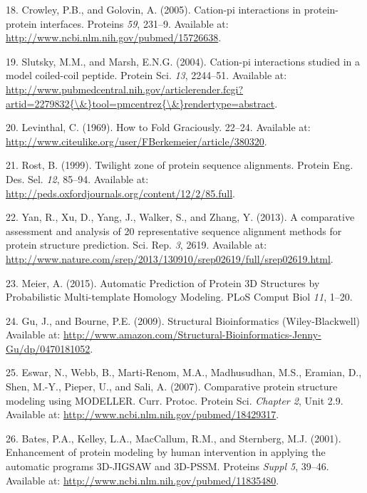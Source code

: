\documentclass[12pt,a4paper,twoside]{book}
\theoremstyle{definition}
\theoremstyle{definition}
\theoremstyle{remark}
\begin{document}
\hypertarget{ref-Crowley2005}{}
18. Crowley, P.B., and Golovin, A. (2005). Cation-pi interactions in
protein-protein interfaces. Proteins \emph{59}, 231--9. Available at:
\url{http://www.ncbi.nlm.nih.gov/pubmed/15726638}.

\hypertarget{ref-Slutsky2004}{}
19. Slutsky, M.M., and Marsh, E.N.G. (2004). Cation-pi interactions
studied in a model coiled-coil peptide. Protein Sci. \emph{13},
2244--51. Available at:
\href{http://www.pubmedcentral.nih.gov/articlerender.fcgi?artid=2279832\%7B/\&\%7Dtool=pmcentrez\%7B/\&\%7Drendertype=abstract}{http://www.pubmedcentral.nih.gov/articlerender.fcgi?artid=2279832\{\textbackslash{}\&\}tool=pmcentrez\{\textbackslash{}\&\}rendertype=abstract}.

\hypertarget{ref-Levinthal1969}{}
20. Levinthal, C. (1969). How to Fold Graciously. 22--24. Available at:
\url{http://www.citeulike.org/user/FBerkemeier/article/380320}.

\hypertarget{ref-Rost1999}{}
21. Rost, B. (1999). Twilight zone of protein sequence alignments.
Protein Eng. Des. Sel. \emph{12}, 85--94. Available at:
\url{http://peds.oxfordjournals.org/content/12/2/85.full}.

\hypertarget{ref-Yan2013}{}
22. Yan, R., Xu, D., Yang, J., Walker, S., and Zhang, Y. (2013). A
comparative assessment and analysis of 20 representative sequence
alignment methods for protein structure prediction. Sci. Rep. \emph{3},
2619. Available at:
\url{http://www.nature.com/srep/2013/130910/srep02619/full/srep02619.html}.

\hypertarget{ref-Meier2015}{}
23. Meier, A. (2015). Automatic Prediction of Protein 3D Structures by
Probabilistic Multi-template Homology Modeling. PLoS Comput Biol
\emph{11}, 1--20.

\hypertarget{ref-Gu2009}{}
24. Gu, J., and Bourne, P.E. (2009). Structural Bioinformatics
(Wiley-Blackwell) Available at:
\url{http://www.amazon.com/Structural-Bioinformatics-Jenny-Gu/dp/0470181052}.

\hypertarget{ref-Eswar2007}{}
25. Eswar, N., Webb, B., Marti-Renom, M.A., Madhusudhan, M.S., Eramian,
D., Shen, M.-Y., Pieper, U., and Sali, A. (2007). Comparative protein
structure modeling using MODELLER. Curr. Protoc. Protein Sci.
\emph{Chapter 2}, Unit 2.9. Available at:
\url{http://www.ncbi.nlm.nih.gov/pubmed/18429317}.

\hypertarget{ref-Bates2001}{}
26. Bates, P.A., Kelley, L.A., MacCallum, R.M., and Sternberg, M.J.
(2001). Enhancement of protein modeling by human intervention in
applying the automatic programs 3D-JIGSAW and 3D-PSSM. Proteins
\emph{Suppl 5}, 39--46. Available at:
\url{http://www.ncbi.nlm.nih.gov/pubmed/11835480}.
\end{document}
